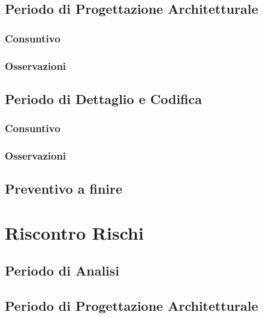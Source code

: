 \documentclass[a4paper, oneside, openany, dvipsnames, table]{article}
\begin{document}
	\subsection{Periodo di Progettazione Architetturale}
	
	\subsubsection{Consuntivo}
		
	\subsubsection{Osservazioni}
		
		
		
	\newpage
	\subsection{Periodo di Dettaglio e Codifica}
	
	\subsubsection{Consuntivo}
		
	\subsubsection{Osservazioni}
		
	\newpage
		\subsection{Preventivo a finire}
		
		
\appendix
{}

\newpage
\section{Riscontro Rischi}
	\label{app:riscontro}
	
	\subsection{Periodo di Analisi}
			
	\subsection{Periodo di Progettazione Architetturale}
	
\end{document}
